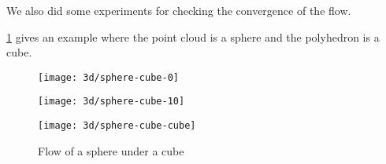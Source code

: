 We also did some experiments for checking the convergence of the flow.

\ref{fig:3d-flow-sphere-cube} gives an example where the point cloud is a sphere
and the polyhedron is a cube.

\begin{figure}[h]
    \centering
    \begin{minipage}{0.32\linewidth}
        \centering
        \texttt{[image: 3d/sphere-cube-0]}
    \end{minipage}
    \begin{minipage}{0.32\linewidth}
        \centering
        \texttt{[image: 3d/sphere-cube-10]}
    \end{minipage}
    \begin{minipage}{0.32\linewidth}
        \centering
        \texttt{[image: 3d/sphere-cube-cube]}
    \end{minipage}

    \caption{Flow of a sphere under a cube}
    \label{fig:3d-flow-sphere-cube}
\end{figure}


